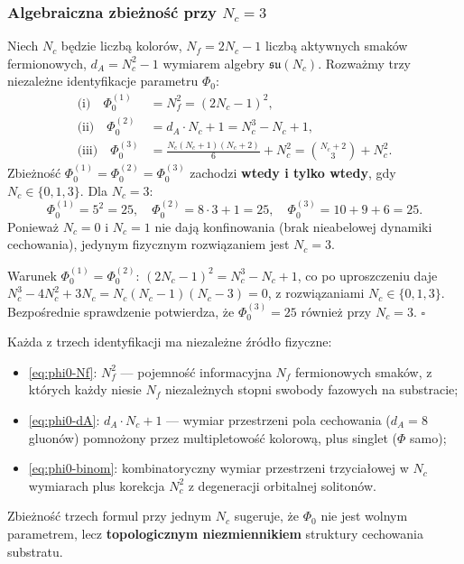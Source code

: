 \subsubsection{Algebraiczna zbieżność przy $N_c = 3$}

\begin{propozycja}[Jedyność $\Phi_0 = 25$ z trzech niezależnych ścieżek]
\label{prop:phi0_convergence}
Niech $N_c$ będzie liczbą kolorów, $N_f = 2N_c - 1$ liczbą aktywnych
smaków fermionowych, $d_A = N_c^2 - 1$ wymiarem algebry $\mathfrak{su}(N_c)$.
Rozważmy trzy niezależne identyfikacje parametru $\Phi_0$:
\begin{align}
  \text{(i)}\quad \Phi_0^{(1)} &= N_f^2 = (2N_c - 1)^2, \label{eq:phi0-Nf}\\
  \text{(ii)}\quad \Phi_0^{(2)} &= d_A \cdot N_c + 1 = N_c^3 - N_c + 1,
    \label{eq:phi0-dA}\\
  \text{(iii)}\quad \Phi_0^{(3)} &= \frac{N_c(N_c+1)(N_c+2)}{6} + N_c^2
    = \binom{N_c+2}{3} + N_c^2. \label{eq:phi0-binom}
\end{align}
Zbieżność $\Phi_0^{(1)} = \Phi_0^{(2)} = \Phi_0^{(3)}$
zachodzi \textbf{wtedy i tylko wtedy}, gdy
$N_c \in \{0, 1, 3\}$. Dla $N_c = 3$:
\begin{equation}
  \Phi_0^{(1)} = 5^2 = 25, \quad
  \Phi_0^{(2)} = 8 \cdot 3 + 1 = 25, \quad
  \Phi_0^{(3)} = 10 + 9 + 6 = 25.
\end{equation}
Ponieważ $N_c = 0$ i $N_c = 1$ nie dają konfinowania
(brak nieabelowej dynamiki cechowania), jedynym fizycznym
rozwiązaniem jest $N_c = 3$.
\end{propozycja}

\begin{dowod}
Warunek $\Phi_0^{(1)} = \Phi_0^{(2)}$:
$(2N_c-1)^2 = N_c^3 - N_c + 1$, co po uproszczeniu daje
$N_c^3 - 4N_c^2 + 3N_c = N_c(N_c-1)(N_c-3) = 0$,
z rozwiązaniami $N_c \in \{0, 1, 3\}$.
Bezpośrednie sprawdzenie potwierdza, że
$\Phi_0^{(3)} = 25$ również przy $N_c = 3$.
\hfill$\square$
\end{dowod}

\begin{uwaga}
\label{rem:phi0_three_paths}
Każda z trzech identyfikacji ma niezależne źródło fizyczne:
\begin{itemize}[nosep]
  \item \eqref{eq:phi0-Nf}: $N_f^2$ — pojemność informacyjna
    $N_f$ fermionowych smaków, z których każdy niesie $N_f$
    niezależnych stopni swobody fazowych na substracie;
  \item \eqref{eq:phi0-dA}: $d_A \cdot N_c + 1$ — wymiar przestrzeni
    pola cechowania ($d_A = 8$ gluonów) pomnożony przez
    multipletowość kolorową, plus singlet ($\Phi$ samo);
  \item \eqref{eq:phi0-binom}: kombinatoryczny wymiar przestrzeni
    trzyciałowej w $N_c$ wymiarach plus korekcja $N_c^2$
    z degeneracji orbitalnej solitonów.
\end{itemize}
Zbieżność trzech formul przy jednym $N_c$ sugeruje, że
$\Phi_0$ nie jest wolnym parametrem, lecz \textbf{topologicznym
niezmiennikiem} struktury cechowania substratu.
\end{uwaga}

